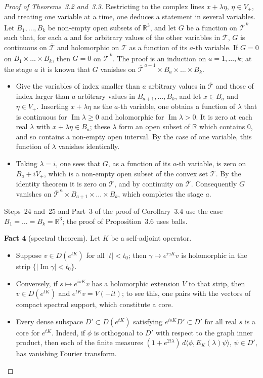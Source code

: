 \documentclass[11pt,letterpaper,reqno]{amsart}
\theoremstyle{definition}
\begin{document}
\begin{proof}[Proof of Theorems~3.2 and~3.3]
Restricting to the complex lines $x+\lambda\eta$, $\eta\in V_+$, and treating one variable at a time, one deduces a statement in several variables.
Let $B_1,\dots,B_k$ be non-empty open subsets of $\mathbb R^3$, and let $G$ be a function on $\overline{\mathcal T}^{\,k}$ such that, for each $a$ and for arbitrary values of the other variables in $\overline{\mathcal T}$, $G$ is continuous on $\overline{\mathcal T}$ and holomorphic on $\mathcal T$ as a function of its $a$-th variable.
If $G=0$ on $B_1\times\dots\times B_k$, then $G=0$ on $\overline{\mathcal T}^{\,k}$.
The proof is an induction on $a=1,\dots,k$; at the stage $a$ it is known that $G$ vanishes on $\overline{\mathcal T}^{\,a-1}\times B_a\times\dots\times B_k$.
\begin{itemize}
\item[(1)] Give the variables of index smaller than $a$ arbitrary values in $\overline{\mathcal T}$ and those of index larger than $a$ arbitrary values in $B_{a+1},\dots,B_k$, and let $x\in B_a$ and $\eta\in V_+$.
Inserting $x+\lambda\eta$ as the $a$-th variable, one obtains a function of $\lambda$ that is continuous for $\operatorname{Im}\lambda\ge0$ and holomorphic for $\operatorname{Im}\lambda>0$.
It is zero at each real $\lambda$ with $x+\lambda\eta\in B_a$; these $\lambda$ form an open subset of $\mathbb R$ which contains $0$, and so contains a non-empty open interval.
By the case of one variable, this function of $\lambda$ vanishes identically.
\item[(2)] Taking $\lambda=i$, one sees that $G$, as a function of its $a$-th variable, is zero on $B_a+iV_+$, which is a non-empty open subset of the convex set $\mathcal T$.
By the identity theorem it is zero on $\mathcal T$, and by continuity on $\overline{\mathcal T}$.
Consequently $G$ vanishes on $\overline{\mathcal T}^{\,a}\times B_{a+1}\times\dots\times B_k$, which completes the stage $a$.
\end{itemize}
Steps~24 and~25 and Part~3 of the proof of Corollary~3.4 use the case $B_1=\dots=B_k=\mathbb R^3$; the proof of Proposition~3.6 uses balls.

\textbf{Fact 4} (spectral theorem).
Let $K$ be a self-adjoint operator.
\begin{itemize}
\item[(i)] Suppose $v\in D(e^{tK})$ for all $|t|<t_0$; then $\gamma\mapsto e^{i\gamma K}v$ is holomorphic in the strip $\{|\operatorname{Im}\gamma|<t_0\}$.
\item[(ii)] Conversely, if $s\mapsto e^{isK}v$ has a holomorphic extension $V$ to that strip, then $v\in D(e^{tK})$ and $e^{tK}v=V(-it)$; to see this, one pairs with the vectors of compact spectral support, which constitute a core.
\item[(iii)] Every dense subspace $D'\subset D(e^{tK})$ satisfying $e^{isK}D'\subset D'$ for all real $s$ is a core for $e^{tK}$.
Indeed, if $\phi$ is orthogonal to $D'$ with respect to the graph inner product, then each of the finite measures $(1+e^{2t\lambda})\,d\langle\phi,E_K(\lambda)\psi\rangle$, $\psi\in D'$, has vanishing Fourier transform.
\end{itemize}


\end{proof}
\end{document}
